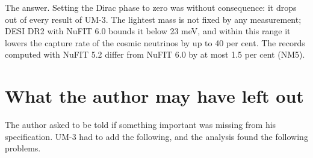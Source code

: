 \documentclass[
  10pt,
]{article}
\begin{document}
The answer. Setting the Dirac phase to zero was without consequence: it
drops out of every result of UM-3. The lightest mass is not fixed by any
measurement; DESI DR2 with NuFIT 6.0 bounds it below 23 meV, and within
this range it lowers the capture rate of the cosmic neutrinos by up to
40 per cent. The records computed with NuFIT 5.2 differ from NuFIT 6.0
by at most 1.5 per cent (NM5).

\hypertarget{what-the-author-may-have-left-out}{%
\section{What the author may have left
out}\label{what-the-author-may-have-left-out}}

The author asked to be told if something important was missing from his
specification. UM-3 had to add the following, and the analysis found the
following problems.
\end{document}
